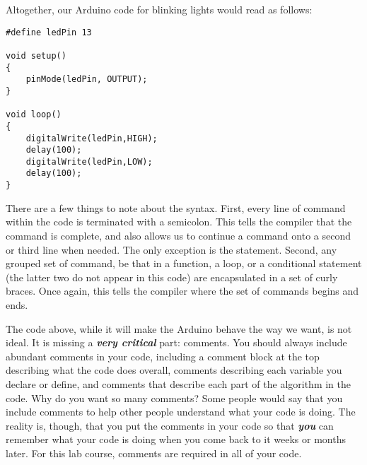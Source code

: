 Altogether, our Arduino code for blinking lights would read as follows:
\begin{lstlisting}[language=Arduino] 
#define ledPin 13

void setup() 
{
    pinMode(ledPin, OUTPUT);
}

void loop() 
{
    digitalWrite(ledPin,HIGH);
    delay(100);
    digitalWrite(ledPin,LOW);
    delay(100);
}
\end{lstlisting}
There are a few things to note about the syntax. First, every line of command
within the code is terminated with a semicolon. This tells the compiler that the
command is complete, and also allows us to continue a command onto a second
or third line when needed. The only exception is the  statement.
Second, any grouped set of command, be that in a function, a loop, or a 
conditional statement (the latter two do not appear in this code) are 
encapsulated in a set of curly braces. Once again, this tells the compiler 
where the set of commands begins and ends.

The code above, while it will make the Arduino behave the way we want, is not
ideal. It is missing a \textit{\textbf{very critical}} part: comments. You 
should always include abundant comments in your code, including a comment 
block at the top describing what the code does overall, comments describing
each variable you declare or define, and comments that describe each part of
the algorithm in the code. Why do you want so many comments? Some people would
say that you include comments to help other people understand what your code
is doing. The reality is, though, that you put the comments in your code so 
that \textit{\textbf{you}} can remember what your code is doing when you 
come back to it weeks or months later. For this lab course, comments are 
required in all of your code.

